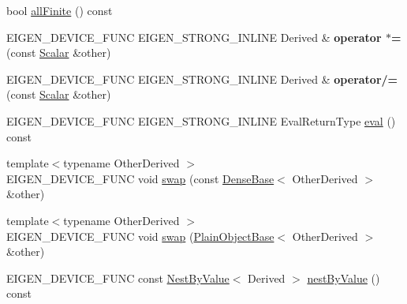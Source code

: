 \begin{DoxyCompactItemize}
\item 
bool \mbox{\hyperlink{class_eigen_1_1_dense_base_af1e669fd3aaae50a4870dc1b8f3b8884}{all\+Finite}} () const
\item 
\mbox{\label{class_eigen_1_1_dense_base_a8ae4f90bd20a057b3cbfc43bc9e92830}} 
E\+I\+G\+E\+N\+\_\+\+D\+E\+V\+I\+C\+E\+\_\+\+F\+U\+NC E\+I\+G\+E\+N\+\_\+\+S\+T\+R\+O\+N\+G\+\_\+\+I\+N\+L\+I\+NE Derived \& {\bfseries operator $\ast$=} (const \mbox{\hyperlink{class_eigen_1_1_dense_base_a5feed465b3a8e60c47e73ecce83e39a2}{Scalar}} \&other)
\item 
\mbox{\label{class_eigen_1_1_dense_base_a7d10c42cfb8809d06310970ae7ae4331}} 
E\+I\+G\+E\+N\+\_\+\+D\+E\+V\+I\+C\+E\+\_\+\+F\+U\+NC E\+I\+G\+E\+N\+\_\+\+S\+T\+R\+O\+N\+G\+\_\+\+I\+N\+L\+I\+NE Derived \& {\bfseries operator/=} (const \mbox{\hyperlink{class_eigen_1_1_dense_base_a5feed465b3a8e60c47e73ecce83e39a2}{Scalar}} \&other)
\item 
E\+I\+G\+E\+N\+\_\+\+D\+E\+V\+I\+C\+E\+\_\+\+F\+U\+NC E\+I\+G\+E\+N\+\_\+\+S\+T\+R\+O\+N\+G\+\_\+\+I\+N\+L\+I\+NE Eval\+Return\+Type \mbox{\hyperlink{class_eigen_1_1_dense_base_a5df64c66228ba75bbc66db2584185527}{eval}} () const
\item 
{\footnotesize template$<$typename Other\+Derived $>$ }\\E\+I\+G\+E\+N\+\_\+\+D\+E\+V\+I\+C\+E\+\_\+\+F\+U\+NC void \mbox{\hyperlink{class_eigen_1_1_dense_base_ab420d9d588ac443f5a1b1a7dceb12c90}{swap}} (const \mbox{\hyperlink{class_eigen_1_1_dense_base}{Dense\+Base}}$<$ Other\+Derived $>$ \&other)
\item 
{\footnotesize template$<$typename Other\+Derived $>$ }\\E\+I\+G\+E\+N\+\_\+\+D\+E\+V\+I\+C\+E\+\_\+\+F\+U\+NC void \mbox{\hyperlink{class_eigen_1_1_dense_base_aaab63cc56d30cc7c23a80304ab94ba2e}{swap}} (\mbox{\hyperlink{class_eigen_1_1_plain_object_base}{Plain\+Object\+Base}}$<$ Other\+Derived $>$ \&other)
\item 
E\+I\+G\+E\+N\+\_\+\+D\+E\+V\+I\+C\+E\+\_\+\+F\+U\+NC const \mbox{\hyperlink{class_eigen_1_1_nest_by_value}{Nest\+By\+Value}}$<$ Derived $>$ \mbox{\hyperlink{class_eigen_1_1_dense_base_a3e2761e2b6da74dba1d17b40cc918bf7}{nest\+By\+Value}} () const
\item 
\mbox{\label{class_eigen_1_1_dense_base_aad0339f0ad1bb702de4c398312a8a174}} 

\end{DoxyCompactItemize}
